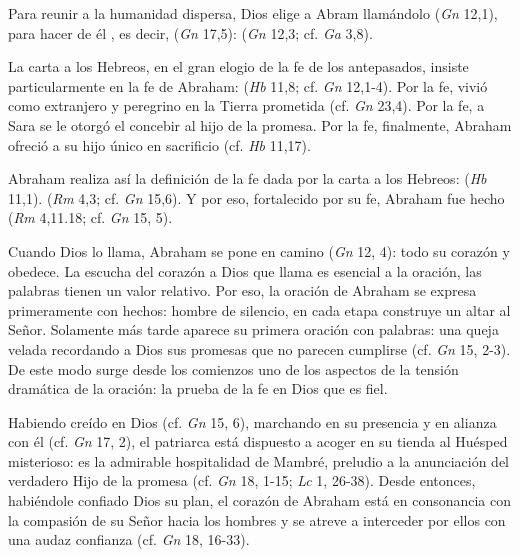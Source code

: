\begin{ccebody}

 Para reunir a la humanidad dispersa, Dios elige a Abram llamándolo  (\textit{Gn} 12,1), para hacer de él , es decir,  (\textit{Gn} 17,5):  (\textit{Gn} 12,3; cf. \textit{Ga} 3,8).


 La carta a los Hebreos, en el gran elogio de la fe de los antepasados, insiste particularmente en la fe de Abraham:  (\textit{Hb} 11,8; cf. \textit{Gn} 12,1-4). Por la fe, vivió como extranjero y peregrino en la Tierra prometida (cf. \textit{Gn} 23,4). Por la fe, a Sara se le otorgó el concebir al hijo de la promesa. Por la fe, finalmente, Abraham ofreció a su hijo único en sacrificio (cf. \textit{Hb} 11,17).

 Abraham realiza así la definición de la fe dada por la carta a los Hebreos:  (\textit{Hb} 11,1).  (\textit{Rm} 4,3; cf. \textit{Gn} 15,6). Y por eso, fortalecido por su fe, Abraham fue hecho  (\textit{Rm} 4,11.18; cf. \textit{Gn} 15, 5).


 Cuando Dios lo llama, Abraham se pone en camino  (\textit{Gn} 12, 4): todo su corazón  y obedece. La escucha del corazón a Dios que llama es esencial a la oración, las palabras tienen un valor relativo. Por eso, la oración de Abraham se expresa primeramente con hechos: hombre de silencio, en cada etapa construye un altar al Señor. Solamente más tarde aparece su primera oración con palabras: una queja velada recordando a Dios sus promesas que no parecen cumplirse (cf. \textit{Gn} 15, 2-3). De este modo surge desde los comienzos uno de los aspectos de la tensión dramática de la oración: la prueba de la fe en Dios que es fiel.

 Habiendo creído en Dios (cf. \textit{Gn} 15, 6), marchando en su presencia y en alianza con él (cf. \textit{Gn} 17, 2), el patriarca está dispuesto a acoger en su tienda al Huésped misterioso: es la admirable hospitalidad de Mambré, preludio a la anunciación del verdadero Hijo de la promesa (cf. \textit{Gn} 18, 1-15; \textit{Lc} 1, 26-38). Desde entonces, habiéndole confiado Dios su plan, el corazón de Abraham está en consonancia con la compasión de su Señor hacia los hombres y se atreve a interceder por ellos con una audaz confianza (cf. \textit{Gn} 18, 16-33).


\end{ccebody}
